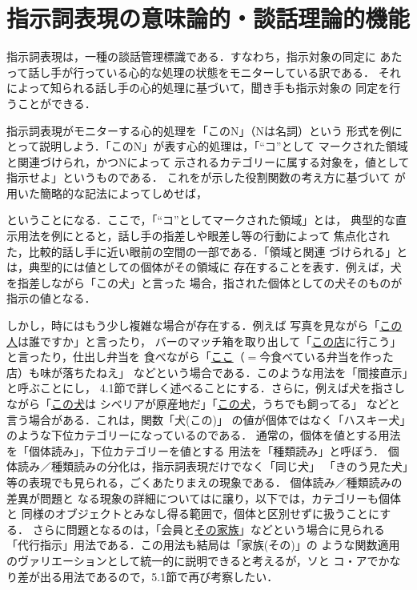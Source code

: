 \section{指示詞表現の意味論的・談話理論的機能}
指示詞表現は，一種の談話管理標識である．すなわち，指示対象の同定に
あたって話し手が行っている心的な処理の状態をモニターしている訳である．
それによって知られる話し手の心的処理に基づいて，聞き手も指示対象の
同定を行うことができる．

指示詞表現がモニターする心的処理を「このN」（Nは名詞）という
形式を例にとって説明しよう．「このN」が表す心的処理は，「``コ''として
マークされた領域と関連づけられ，かつNによって
示されるカテゴリーに属する対象を，値として指示せよ」というものである．
これをが示した役割関数の考え方に基づいて
が用いた簡略的な記法によってしめせば，


ということになる．ここで，「``コ''としてマークされた領域」とは，
典型的な直示用法を例にとると，話し手の指差しや眼差し等の行動によって
焦点化された，比較的話し手に近い眼前の空間の一部である．「領域と関連
づけられる」とは，典型的には値としての個体がその領域に
存在することを表す．例えば，犬を指差しながら「この犬」と言った
場合，指された個体としての犬そのものが指示の値となる．

しかし，時にはもう少し複雑な場合が存在する．例えば
写真を見ながら「\ul{この人}は誰ですか」と言ったり，
バーのマッチ箱を取り出して「\ul{この店}に行こう」と言ったり，仕出し弁当を
食べながら「\ul{ここ}（$=$今食べている弁当を作った店）も味が落ちたねえ」
などという場合である．このような用法を「間接直示」と呼ぶことにし，
4.1節で詳しく述べることにする．さらに，例えば犬を指さしながら「\ul{この犬}は
シベリアが原産地だ」「\ul{この犬}，うちでも飼ってる」
などと言う場合がある．これは，関数「犬(この)」
の値が個体ではなく「ハスキー犬」のような下位カテゴリーになっているのである．
通常の，個体を値とする用法を「個体読み」，下位カテゴリーを値とする
用法を「種類読み」と呼ぼう．
個体読み／種類読みの分化は，指示詞表現だけでなく「同じ犬」
「きのう見た犬」等の表現でも見られる，ごくあたりまえの現象である．
個体読み／種類読みの差異が問題と
なる現象の詳細についてはに譲り，以下では，カテゴリーも個体と
同様のオブジェクトとみなし得る範囲で，個体と区別せずに扱うことにする．
さらに問題となるのは，「会員と\ul{その家族}」などという場合に見られる
「代行指示」用法\cite{syooho81}である．この用法も結局は「家族(その)」の
ような関数適用のヴァリエーションとして統一的に説明できると考えるが，ソと
コ・アでかなり差が出る用法であるので，5.1節で再び考察したい．

